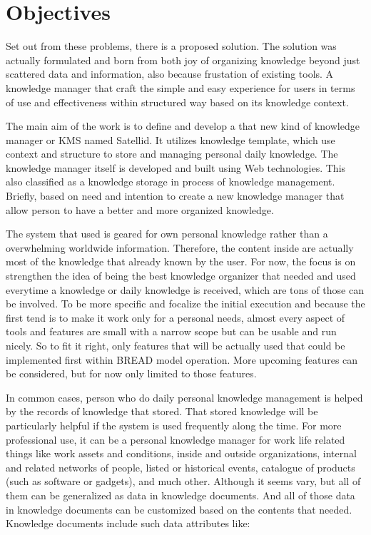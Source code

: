 \section{Objectives}
\label{sec:objectives}

Set out from these problems, there is a proposed solution.
The solution was actually formulated and born from both joy of organizing knowledge beyond just scattered data and information, also because frustation of existing tools.
A knowledge manager that craft the simple and easy experience for users in terms of use and effectiveness within structured way based on its knowledge context.

The main aim of the work is to define and develop a that new kind of knowledge manager or \ac{KMS} named Satellid.
It utilizes knowledge template, which use context and structure to store and managing personal daily knowledge.
The knowledge manager itself is developed and built using Web technologies.
This also classified as a knowledge storage in process of knowledge management.
Briefly, based on need and intention to create a new knowledge manager that allow person to have a better and more organized knowledge.

The system that used is geared for own personal knowledge rather than a overwhelming worldwide information.
Therefore, the content inside are actually most of the knowledge that already known by the user.
For now, the focus is on strengthen the idea of being the best knowledge organizer that needed and used everytime a knowledge or daily knowledge is received, which are tons of those can be involved.
To be more specific and focalize the initial execution and because the first tend is to make it work only for a personal needs, almost every aspect of tools and features are small with a narrow scope but can be usable and run nicely.
So to fit it right, only features that will be actually used that could be implemented first within \ac{BREAD} model operation.
More upcoming features can be considered, but for now only limited to those features.

In common cases, person who do daily personal knowledge management is helped by the records of knowledge that stored.
That stored knowledge will be particularly helpful if the system is used frequently along the time.
For more professional use, it can be a personal knowledge manager for work life related things like work assets and conditions, inside and outside organizations, internal and related networks of people, listed or historical events, catalogue of products (such as software or gadgets), and much other.
Although it seems vary, but all of them can be generalized as data in knowledge documents.
And all of those data in knowledge documents can be customized based on the contents that needed.
Knowledge documents include such data attributes like:

